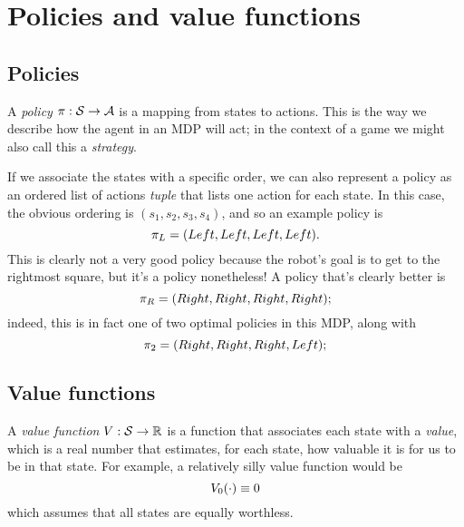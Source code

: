 \documentclass[a4paper]{article}
\begin{document}
\section{Policies and value functions}
\subsection{Policies}
A \emph{policy} $\pi : \mathcal{S} \to \mathcal{A}$ is a mapping from states to
actions.
This is the way we describe how the agent in an MDP will act;
in the context of a game we might also call this a \emph{strategy}.

If we associate the states with a specific order, we can also represent a
policy as an ordered list of actions \emph{tuple} that lists one action
for each state.
In this case, the obvious ordering is $(s_1, s_2, s_3, s_4)$,
and so an example policy is
\begin{equation*}
  \pi_L = (Left, Left, Left, Left) .
\end{equation*}
This is clearly not a very good policy because the robot's goal is to
get to the rightmost square, but it's a policy nonetheless!
A policy that's clearly better is
\begin{equation*}
  \pi_R = (Right, Right, Right, Right) ;
\end{equation*}
indeed, this is in fact one of two optimal policies in this MDP,
along with
\begin{equation*}
  \pi_2 = (Right, Right, Right, Left) ;
\end{equation*}

\subsection{Value functions}
A \emph{value function} $V : \mathcal{S} \to \mathbb{R}$ is a function that associates
each state with a \emph{value}, which is a real number that estimates, for
each state, how valuable it is for us to be in that state.
For example, a relatively silly value function would be
\begin{equation*}
  V_0(\cdot) \equiv 0
\end{equation*}
which assumes that all states are equally worthless.
\end{document}
